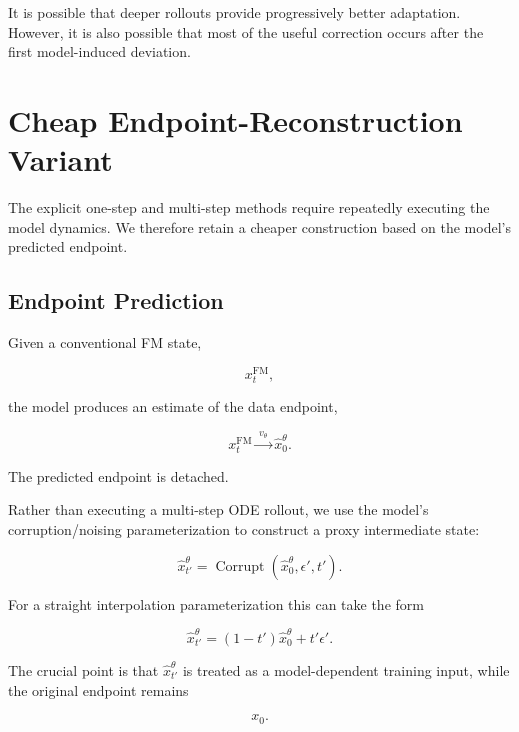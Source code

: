 \documentclass[11pt]{article}
\begin{document}
It is possible that deeper rollouts provide progressively better adaptation.
However, it is also possible that most of the useful correction occurs after
the first model-induced deviation.

\section{Cheap Endpoint-Reconstruction Variant}

The explicit one-step and multi-step methods require repeatedly executing the
model dynamics. We therefore retain a cheaper construction based on the
model's predicted endpoint.

\subsection{Endpoint Prediction}

Given a conventional FM state,

\begin{equation}
x_t^{\mathrm{FM}},
\end{equation}

the model produces an estimate of the data endpoint,

\begin{equation}
x_t^{\mathrm{FM}}
\xrightarrow{\;v_\theta\;}
\hat{x}_0^\theta.
\end{equation}

The predicted endpoint is detached.

Rather than executing a multi-step ODE rollout, we use the model's
corruption/noising parameterization to construct a proxy intermediate state:

\begin{equation}
\boxed{
\hat{x}_{t'}^\theta
=
\operatorname{Corrupt}
\left(
\hat{x}_0^\theta,\epsilon',t'
\right).
}
\end{equation}

For a straight interpolation parameterization this can take the form

\begin{equation}
\hat{x}_{t'}^\theta
=
(1-t')\hat{x}_0^\theta
+
t'\epsilon'.
\end{equation}

The crucial point is that $\hat{x}_{t'}^\theta$ is treated as a model-dependent
training input, while the original endpoint remains

\begin{equation}
x_0.
\end{equation}
\end{document}
